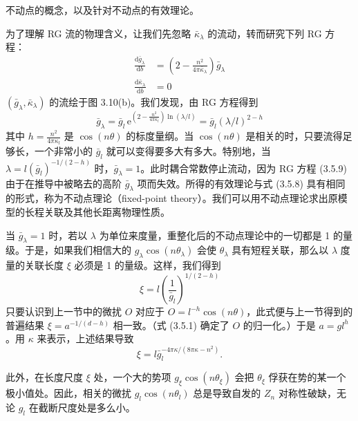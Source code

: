 \begin{keypoints}
\item 不动点的概念，以及针对不动点的有效理论。
\end{keypoints}

为了理解 RG 流的物理含义，让我们先忽略 $\bar{\kappa}_\lambda$ 的流动，转而研究下列 RG 方程：
\begin{align*}
\frac{\mathrm{d}\bar{g}_\lambda}{\mathrm{d}b} &= \left(2 - \frac{n^2}{4\pi\bar{\kappa}_\lambda}\right)\bar{g}_\lambda \\
\frac{\mathrm{d}\bar{\kappa}_\lambda}{\mathrm{d}b} &= 0\tag{3.5.10}
\end{align*}
$(\bar{g}_\lambda,\bar{\kappa}_\lambda)$ 的流绘于图 3.10(b)。我们发现，由 RG 方程得到
\begin{equation*}
\bar{g}_\lambda = \bar{g}_l\,\mathrm{e}^{\left(2 - \frac{n^2}{4\pi\kappa_l}\right)\ln(\lambda/l)} = \bar{g}_l(\lambda/l)^{2-h}
\end{equation*}
其中 $h = \frac{n^2}{4\pi\kappa_l}$ 是 $\cos(n\theta)$ 的标度量纲。当 $\cos(n\theta)$ 是相关的时，只要流得足够长，一个非常小的 $\bar{g}_l$ 就可以变得要多大有多大。特别地，当 $\lambda = l(\bar{g}_l)^{-1/(2-h)}$ 时，$\bar{g}_\lambda = 1$。此时耦合常数停止流动，因为 RG 方程 (3.5.9) 由于在推导中被略去的高阶 $\bar{g}_\lambda$ 项而失效。所得的有效理论与式 (3.5.8) 具有相同的形式，称为不动点理论（fixed-point theory）。我们可以用不动点理论求出原模型的长程关联及其他长距离物理性质。

当 $\bar{g}_\lambda = 1$ 时，若以 $\lambda$ 为单位来度量，重整化后的不动点理论中的一切都是 1 的量级。于是，如果我们相信大的 $g_\lambda\cos(n\theta_\lambda)$ 会使 $\theta_\lambda$ 具有短程关联，那么以 $\lambda$ 度量的关联长度 $\xi$ 必须是 1 的量级。这样，我们得到
\begin{equation*}
\xi = l\left(\frac{1}{\bar{g}_l}\right)^{1/(2-h)}
\end{equation*}
只要认识到上一节中的微扰 $O$ 对应于 $O = l^{-h}\cos(n\theta)$，此式便与上一节得到的普遍结果 $\xi = a^{-1/(d-h)}$ 相一致。（式 (3.5.1) 确定了 $O$ 的归一化。）于是 $a = gl^h$。用 $\kappa$ 来表示，上述结果导致
\begin{equation*}
\xi = l\bar{g}_l^{-4\pi\kappa/(8\pi\kappa - n^2)}.\tag{3.5.11}
\end{equation*}

此外，在长度尺度 $\xi$ 处，一个大的势项 $g_\xi\cos(n\theta_\xi)$ 会把 $\theta_\xi$ 俘获在势的某一个极小值处。因此，相关的微扰 $g_l\cos(n\theta_l)$ 总是导致自发的 $Z_n$ 对称性破缺，无论 $g_l$ 在截断尺度处是多么小。


